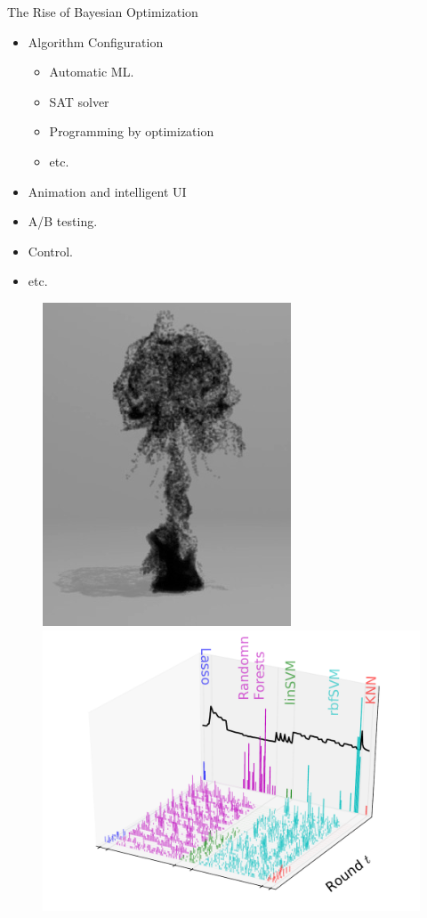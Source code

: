\documentclass[grey]{beamer}
\begin{document}
 \begin{frame}{The Rise of Bayesian Optimization}
 
 \begin{minipage}[l]{0.5\columnwidth}
     \begin{itemize}
   \footnotesize
   \item Algorithm Configuration
   \begin{itemize}
   \footnotesize
    \item Automatic ML.
    \item SAT solver
    \item Programming by optimization
    \item etc.
   \end{itemize}
   \item Animation and intelligent UI
   \item A/B testing.
   \item Control.
   \item etc.
   \end{itemize}
    \end{minipage}
    \begin{minipage}[r]{0.48\columnwidth}
     \begin{figure}[t]
      \includegraphics[width=0.5\columnwidth]{./figs/animation}  
      \includegraphics[width=0.7\columnwidth]{./figs/wine_arms_EI_T40} \\

\end{figure}
\end{minipage}
\end{frame}
\end{document}
